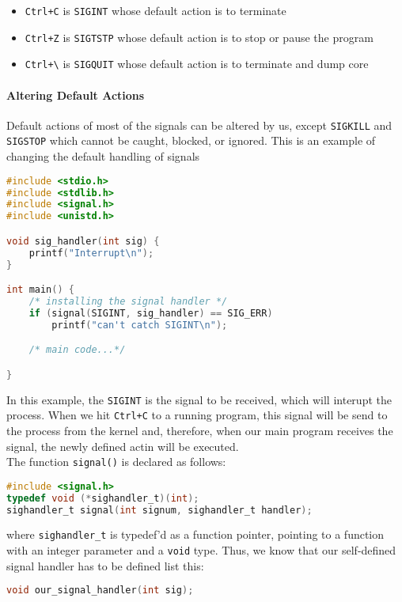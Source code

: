 \documentclass{article}
\renewcommand{\b}{\item[$\circ$]}
\newcommand{\newlist}{\begin{itemize}}
\renewcommand{\endlist}{\end{itemize}}
\newcommand{\code}[1]{\texttt{#1}}
\begin{document}
\newlist 
\b \code{Ctrl+C} is \code{SIGINT} whose default action is to terminate
\b \code{Ctrl+Z} is \code{SIGTSTP} whose default action is to stop or pause the program
\b \code{Ctrl+\textbackslash} is \code{SIGQUIT} whose default action is to terminate and dump core
\endlist 

\paragraph{Altering Default Actions}

Default actions of most of the signals can be altered by us, except \code{SIGKILL} and \code{SIGSTOP} which cannot be caught, blocked, or ignored. This is an example of changing the default handling of signals

\begin{lstlisting}[language=c]
#include <stdio.h>
#include <stdlib.h>
#include <signal.h>
#include <unistd.h>

void sig_handler(int sig) {
    printf("Interrupt\n");
}

int main() {
    /* installing the signal handler */
    if (signal(SIGINT, sig_handler) == SIG_ERR)
        printf("can't catch SIGINT\n");

    /* main code...*/

}
\end{lstlisting}

In this example, the \code{SIGINT} is the signal to be received, which will interupt the process. When we hit \code{Ctrl+C} to a running program, this signal will be send to the process from the kernel and, therefore, when our main program receives the signal, the newly defined actin will be executed. \\ 

The function \code{signal()} is declared as follows:

\begin{lstlisting}[language=C]
#include <signal.h>
typedef void (*sighandler_t)(int);
sighandler_t signal(int signum, sighandler_t handler);
\end{lstlisting}

where \code{sighandler\_t} is typedef'd as a function pointer, pointing to a function with an integer parameter and a \code{void} type. Thus, we know that our self-defined signal handler has to be defined list this:

\begin{lstlisting}[language=C]
void our_signal_handler(int sig);
\end{lstlisting}
\end{document}
